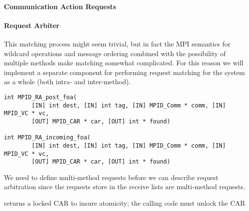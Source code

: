 \paragraph{Communication Action Requests}

\paragraph{Request Arbiter}

%

This matching process might seem trivial, but in fact the MPI semantics for
wildcard operations and message ordering combined with the possibility of
multiple methods make matching somewhat complicated.
For this reason we will implement a separate 
component for performing request matching for the
system as a whole (both intra- and inter-method).

\begin{verbatim}
int MPID_RA_post_foa(
        [IN] int dest, [IN] int tag, [IN] MPID_Comm * comm, [IN] MPID_VC * vc,
        [OUT] MPID_CAR * car, [OUT] int * found)

int MPID_RA_incoming_foa(
        [IN] int dest, [IN] int tag, [IN] MPID_Comm * comm, [IN] MPID_VC * vc,
        [OUT] MPID_CAR * car, [OUT] int * found)
\end{verbatim}

\begin{cmt}[BRT]
  We need to define multi-method requests before we can describe request
  arbitration since the requests store in the receive lists are multi-method
  requests.
\end{cmt}

 returns a locked CAR to insure atomicity; the calling
code must unlock the CAR

